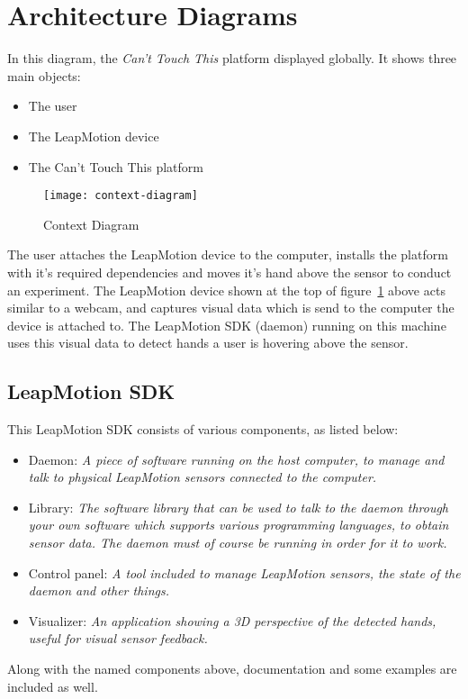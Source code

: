 \documentclass{standalone}
\begin{document}
  \section{Architecture Diagrams}
  In this diagram, the \textit{Can't Touch This} platform displayed globally.
  It shows three main objects:
  \begin{itemize}
    \tightlist{}
    \item The user
    \item The LeapMotion device
    \item The Can't Touch This platform
  \end{itemize}

  \begin{figure}[h]
    \centering
      \texttt{[image: context-diagram]}
    \caption{Context Diagram}
    \label{fig:context-diagram}
  \end{figure}

  The user attaches the LeapMotion device to the computer, installs the platform
  with it's required dependencies and moves it's hand above the sensor to
  conduct an experiment. The LeapMotion device shown at the top of figure~\ref{fig:context-diagram}
  above acts similar to a webcam, and captures visual data which is send to the
  computer the device is attached to. The LeapMotion SDK (daemon) running on
  this machine uses this visual data to detect hands a user is hovering above
  the sensor.

  \subsection{LeapMotion SDK}
  This LeapMotion SDK consists of various components, as listed below:
  \begin{itemize}
    \tightlist{}
    \item Daemon: \textit{%
        A piece of software running on the host computer, to manage and talk
        to physical LeapMotion sensors connected to the computer.
      }
    \item Library: \textit{%
        The software library that can be used to talk to the daemon through
        your own software which supports various programming languages, to
        obtain sensor data. The daemon must of course be running in order for
        it to work.
      }
    \item Control panel: \textit{%
        A tool included to manage LeapMotion sensors, the state of the daemon
        and other things.
      }
    \item Visualizer: \textit{%
        An application showing a 3D perspective of the detected hands, useful
        for visual sensor feedback.
      }
  \end{itemize}
  Along with the named components above, documentation and some examples are
  included as well.
\end{document}
